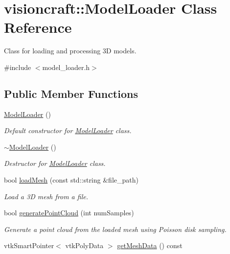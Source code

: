 \hypertarget{classvisioncraft_1_1ModelLoader}{}\section{visioncraft\+:\+:Model\+Loader Class Reference}
\label{classvisioncraft_1_1ModelLoader}


Class for loading and processing 3D models.  




{\ttfamily \#include $<$model\+\_\+loader.\+h$>$}

\subsection*{Public Member Functions}
\begin{DoxyCompactItemize}
\item 
\hyperlink{classvisioncraft_1_1ModelLoader_af5ea231cff5edd6199497c414f0bd079}{Model\+Loader} ()
\begin{DoxyCompactList}\small\item\em Default constructor for \hyperlink{classvisioncraft_1_1ModelLoader}{Model\+Loader} class. \end{DoxyCompactList}\item 
\hyperlink{classvisioncraft_1_1ModelLoader_a64f9d6f1d16b030b7934f8b4bbcd5ef9}{$\sim$\+Model\+Loader} ()
\begin{DoxyCompactList}\small\item\em Destructor for \hyperlink{classvisioncraft_1_1ModelLoader}{Model\+Loader} class. \end{DoxyCompactList}\item 
bool \hyperlink{classvisioncraft_1_1ModelLoader_a61077fd775e05a367f29ec7177c7cb6b}{load\+Mesh} (const std\+::string \&file\+\_\+path)
\begin{DoxyCompactList}\small\item\em Load a 3D mesh from a file. \end{DoxyCompactList}\item 
bool \hyperlink{classvisioncraft_1_1ModelLoader_a9ab4c567f98c43ba6b5312525066cb24}{generate\+Point\+Cloud} (int num\+Samples)
\begin{DoxyCompactList}\small\item\em Generate a point cloud from the loaded mesh using Poisson disk sampling. \end{DoxyCompactList}\item 
vtk\+Smart\+Pointer$<$ vtk\+Poly\+Data $>$ \hyperlink{classvisioncraft_1_1ModelLoader_a9d6f2a8207b0df26e5be8bd1ed16b87c}{get\+Mesh\+Data} () const

\end{DoxyCompactItemize}
